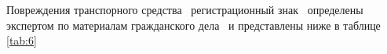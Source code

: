 %
 
  Повреждения транспорного средства  \, регистрационный знак \, определены экспертом по материалам гражданского дела \delonum\, и представлены ниже в таблице \ref{tab:6}
 
